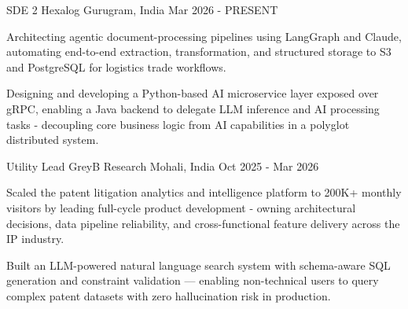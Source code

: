 \documentclass[11pt, a4paper]{awesome-cv}
\begin{document}
\begin{cventries}

\cventry
    {SDE 2} %
    {Hexalog} %
    {Gurugram, India} %
    {Mar 2026 - PRESENT} %
    {
      \begin{cvitems}
        \item {Architecting agentic document-processing pipelines using LangGraph and Claude, automating end-to-end extraction, transformation, and structured storage to S3 and PostgreSQL for logistics trade workflows.}
        \item {Designing and developing a Python-based AI microservice layer exposed over gRPC, enabling a Java backend to delegate LLM inference and AI processing tasks - decoupling core business logic from AI capabilities in a polyglot distributed system.}
      \end{cvitems}
    }
\vspace{0.4cm}  %


\cventry
    {Utility Lead} %
    {GreyB Research} %
    {Mohali, India} %
    {Oct 2025 - Mar 2026} %
    {
      \begin{cvitems}
        \item {Scaled the patent litigation analytics and intelligence platform to 200K+ monthly visitors by leading full-cycle product development - owning architectural decisions, data pipeline reliability, and cross-functional feature delivery across the IP industry.}
        \item {Built an LLM-powered natural language search system with schema-aware SQL generation and constraint validation — enabling non-technical users to query complex patent datasets with zero hallucination risk in production.}
      \end{cvitems}
    }
\vspace{0.4cm}  %


\end{cventries}
\end{document}
